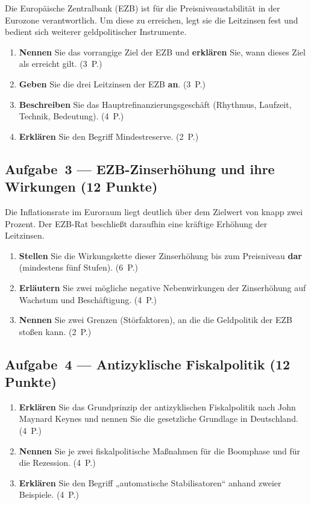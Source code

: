 \documentclass[11pt, a4paper]{article}
\begin{document}
Die Europäische Zentralbank (EZB) ist für die Preisniveaustabilität in der Eurozone
verantwortlich. Um diese zu erreichen, legt sie die Leitzinsen fest und bedient sich
weiterer geldpolitischer Instrumente.

\begin{enumerate}[label=(\alph*)]
  \item \textbf{Nennen} Sie das vorrangige Ziel der EZB und \textbf{erklären} Sie, wann
    dieses Ziel als erreicht gilt. \hfill (3~P.)
  \item \textbf{Geben} Sie die drei Leitzinsen der EZB \textbf{an}. \hfill (3~P.)
  \item \textbf{Beschreiben} Sie das Hauptrefinanzierungsgeschäft (Rhythmus, Laufzeit,
    Technik, Bedeutung). \hfill (4~P.)
  \item \textbf{Erklären} Sie den Begriff Mindestreserve. \hfill (2~P.)
\end{enumerate}

\subsection*{Aufgabe~3 --- EZB-Zinserhöhung und ihre Wirkungen (12 Punkte)}

Die Inflationsrate im Euroraum liegt deutlich über dem Zielwert von knapp zwei Prozent.
Der EZB-Rat beschließt daraufhin eine kräftige Erhöhung der Leitzinsen.

\begin{enumerate}[label=(\alph*)]
  \item \textbf{Stellen} Sie die Wirkungskette dieser Zinserhöhung bis zum Preisniveau
    \textbf{dar} (mindestens fünf Stufen). \hfill (6~P.)
  \item \textbf{Erläutern} Sie zwei mögliche negative Nebenwirkungen der Zinserhöhung auf
    Wachstum und Beschäftigung. \hfill (4~P.)
  \item \textbf{Nennen} Sie zwei Grenzen (Störfaktoren), an die die Geldpolitik der EZB
    stoßen kann. \hfill (2~P.)
\end{enumerate}

\subsection*{Aufgabe~4 --- Antizyklische Fiskalpolitik (12 Punkte)}

\begin{enumerate}[label=(\alph*)]
  \item \textbf{Erklären} Sie das Grundprinzip der antizyklischen Fiskalpolitik nach
    John Maynard Keynes und nennen Sie die gesetzliche Grundlage in Deutschland. \hfill (4~P.)
  \item \textbf{Nennen} Sie je zwei fiskalpolitische Maßnahmen für die Boomphase und für
    die Rezession. \hfill (4~P.)
  \item \textbf{Erklären} Sie den Begriff „automatische Stabilisatoren`` anhand zweier
    Beispiele. \hfill (4~P.)
\end{enumerate}
\end{document}
